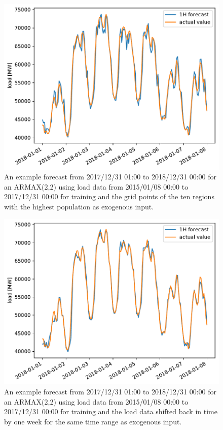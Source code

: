 \begin{figure}[h!]%
\centering
\includegraphics[width=\textwidth]{plots/ARMAXfc/ARMAX_p2q2_data2015to2017_fcto2018123100_t2m_top10_plot_range2018010100_2018010800}%
\caption{An example forecast from 2017/12/31 01:00 to 2018/12/31 00:00 for an ARMAX(2,2) using load data from 2015/01/08 00:00 to 2017/12/31 00:00 for training and the grid points of the ten regions with the highest population as exogenous input.}%
\label{fig:armax_fc_dayofweek}%
\end{figure}

\begin{figure}[h!]%
\centering
\includegraphics[width=\textwidth]{plots/ARMAXfc/ARMAX_p2q2_data2015to2017_fcto2018123100_load_lag_plot_range2018010100_2018010800}%
\caption{An example forecast from 2017/12/31 01:00 to 2018/12/31 00:00 for an ARMAX(2,2) using load data from 2015/01/08 00:00 to 2017/12/31 00:00 for training and the load data shifted back in time by one week for the same time range as exogenous input.}%
\label{fig:armax_fc_load_lag}%
\end{figure}

